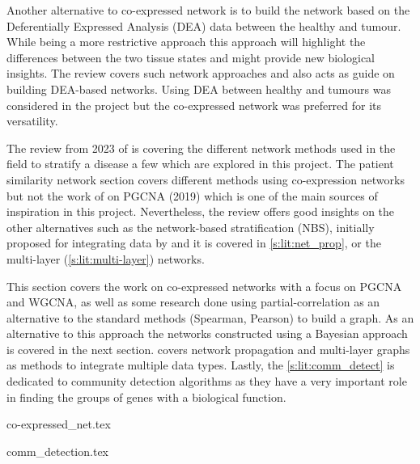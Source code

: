 Another alternative to co-expressed network is to build the network based on the Deferentially Expressed Analysis (DEA) data between the healthy and tumour. While being a more restrictive approach this approach will highlight the differences between the two tissue states and might provide new biological insights. The review \citet{Van_Dam2018-id} covers such network approaches and also acts as guide on building DEA-based networks. Using DEA between healthy and tumours was considered in the project but the co-expressed network was preferred for its versatility.

The review from 2023 of \citet{Petti2023-qo} is covering the different network methods used in the field to stratify a disease a few which are explored in this project. The patient similarity network section covers different methods using co-expression networks but not the work of \citet{Care2019-ij} on PGCNA (2019) which is one of the main sources of inspiration in this project. Nevertheless, the review offers good insights on the other alternatives such as the network-based stratification (NBS), initially proposed for integrating data by \citet{Hofree2013-ld} and it is covered in \cref{s:lit:net_prop}, or the multi-layer (\cref{s:lit:multi-layer}) networks.

This section covers the work on co-expressed networks with a focus on PGCNA and WGCNA, as well as some research done using partial-correlation as an alternative to the standard methods (Spearman, Pearson) to build a graph. As an alternative to this approach the networks constructed using a Bayesian approach is covered in the next section.  covers network propagation and multi-layer graphs as methods to integrate multiple data types. Lastly, the \cref{s:lit:comm_detect} is dedicated to community detection algorithms as they have a very important role in finding the groups of genes with a biological function.

{co-expressed_net.tex}

{comm_detection.tex}





